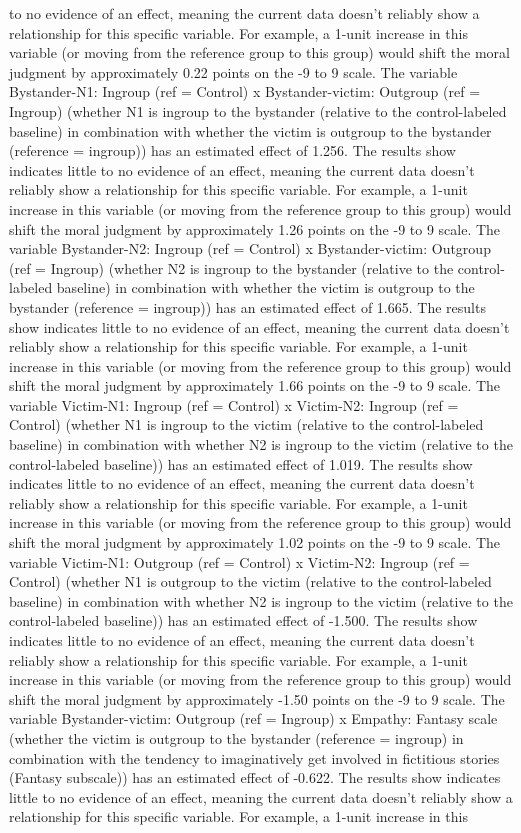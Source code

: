\documentclass[11pt]{article}
\begin{document}
to no evidence of an effect, meaning the current data doesn't reliably show a relationship for this specific variable. For example, a 1-unit increase in this variable (or moving from the reference group to this group) would shift the moral judgment by approximately 0.22 points on the -9 to 9 scale. The variable Bystander-N1: Ingroup (ref = Control) x Bystander-victim: Outgroup (ref = Ingroup) (whether N1 is ingroup to the bystander (relative to the control-labeled baseline) in combination with whether the victim is outgroup to the bystander (reference = ingroup)) has an estimated effect of 1.256. The results show indicates little to no evidence of an effect, meaning the current data doesn't reliably show a relationship for this specific variable. For example, a 1-unit increase in this variable (or moving from the reference group to this group) would shift the moral judgment by approximately 1.26 points on the -9 to 9 scale. The variable Bystander-N2: Ingroup (ref = Control) x Bystander-victim: Outgroup (ref = Ingroup) (whether N2 is ingroup to the bystander (relative to the control-labeled baseline) in combination with whether the victim is outgroup to the bystander (reference = ingroup)) has an estimated effect of 1.665. The results show indicates little to no evidence of an effect, meaning the current data doesn't reliably show a relationship for this specific variable. For example, a 1-unit increase in this variable (or moving from the reference group to this group) would shift the moral judgment by approximately 1.66 points on the -9 to 9 scale. The variable Victim-N1: Ingroup (ref = Control) x Victim-N2: Ingroup (ref = Control) (whether N1 is ingroup to the victim (relative to the control-labeled baseline) in combination with whether N2 is ingroup to the victim (relative to the control-labeled baseline)) has an estimated effect of 1.019. The results show indicates little to no evidence of an effect, meaning the current data doesn't reliably show a relationship for this specific variable. For example, a 1-unit increase in this variable (or moving from the reference group to this group) would shift the moral judgment by approximately 1.02 points on the -9 to 9 scale. The variable Victim-N1: Outgroup (ref = Control) x Victim-N2: Ingroup (ref = Control) (whether N1 is outgroup to the victim (relative to the control-labeled baseline) in combination with whether N2 is ingroup to the victim (relative to the control-labeled baseline)) has an estimated effect of -1.500. The results show indicates little to no evidence of an effect, meaning the current data doesn't reliably show a relationship for this specific variable. For example, a 1-unit increase in this variable (or moving from the reference group to this group) would shift the moral judgment by approximately -1.50 points on the -9 to 9 scale. The variable Bystander-victim: Outgroup (ref = Ingroup) x Empathy: Fantasy scale (whether the victim is outgroup to the bystander (reference = ingroup) in combination with the tendency to imaginatively get involved in fictitious stories (Fantasy subscale)) has an estimated effect of -0.622. The results show indicates little to no evidence of an effect, meaning the current data doesn't reliably show a relationship for this specific variable. For example, a 1-unit increase in this 
\end{document}
